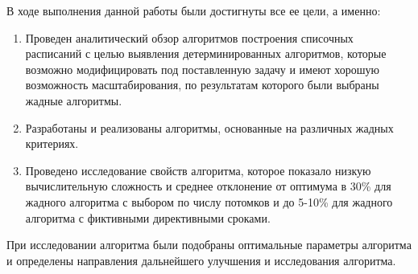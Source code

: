 В ходе выполнения данной работы были достигнуты все ее цели, а именно:
\begin{enumerate}
    \item Проведен аналитический обзор алгоритмов построения списочных расписаний с целью выявления детерминированных алгоритмов, которые возможно модифицировать под поставленную задачу и имеют хорошую возможность масштабирования, по результатам которого были выбраны жадные алгоритмы.
    \item Разработаны и реализованы алгоритмы, основанные на различных жадных критериях.
    \item Проведено исследование свойств алгоритма, которое показало низкую вычислительную сложность и среднее отклонение от оптимума в 30\% для жадного алгоритма с выбором по числу потомков и до 5-10\% для жадного алгоритма с фиктивными директивными сроками.
\end{enumerate}

При исследовании алгоритма были подобраны оптимальные параметры алгоритма и определены направления дальнейшего улучшения и исследования алгоритма.